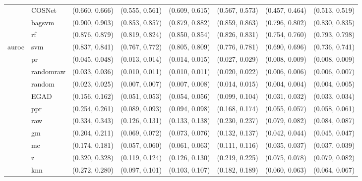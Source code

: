 \begin{table}[H]
{\begin{tabular}{llllllll}
 & COSNet & (0.660, 0.666) & (0.555, 0.561) & (0.609, 0.615) & (0.567, 0.573) & (0.457, 0.464) & (0.513, 0.519)\\

 & bagsvm & (0.900, 0.903) & (0.853, 0.857) & (0.879, 0.882) & (0.859, 0.863) & (0.796, 0.802) & (0.830, 0.835)\\

 & rf & (0.876, 0.879) & (0.819, 0.824) & (0.850, 0.854) & (0.826, 0.831) & (0.754, 0.760) & (0.793, 0.798)\\

\multirow{-15}{*}{\raggedright\arraybackslash auroc} & svm & (0.837, 0.841) & (0.767, 0.772) & (0.805, 0.809) & (0.776, 0.781) & (0.690, 0.696) & (0.736, 0.741)\\
\cmidrule{1-8}
 & pr & (0.045, 0.048) & (0.013, 0.014) & (0.014, 0.015) & (0.027, 0.029) & (0.008, 0.009) & (0.008, 0.009)\\

 & randomraw & (0.033, 0.036) & (0.010, 0.011) & (0.010, 0.011) & (0.020, 0.022) & (0.006, 0.006) & (0.006, 0.007)\\

 & random & (0.023, 0.025) & (0.007, 0.007) & (0.007, 0.008) & (0.014, 0.015) & (0.004, 0.004) & (0.004, 0.005)\\

 & EGAD & (0.156, 0.162) & (0.051, 0.053) & (0.054, 0.056) & (0.099, 0.104) & (0.031, 0.032) & (0.033, 0.034)\\

 & ppr & (0.254, 0.261) & (0.089, 0.093) & (0.094, 0.098) & (0.168, 0.174) & (0.055, 0.057) & (0.058, 0.061)\\

 & raw & (0.334, 0.343) & (0.126, 0.131) & (0.133, 0.138) & (0.230, 0.237) & (0.079, 0.082) & (0.084, 0.087)\\

 & gm & (0.204, 0.211) & (0.069, 0.072) & (0.073, 0.076) & (0.132, 0.137) & (0.042, 0.044) & (0.045, 0.047)\\

 & mc & (0.174, 0.181) & (0.057, 0.060) & (0.061, 0.063) & (0.111, 0.116) & (0.035, 0.037) & (0.037, 0.039)\\

 & z & (0.320, 0.328) & (0.119, 0.124) & (0.126, 0.130) & (0.219, 0.225) & (0.075, 0.078) & (0.079, 0.082)\\

 & knn & (0.272, 0.280) & (0.097, 0.101) & (0.103, 0.107) & (0.182, 0.189) & (0.060, 0.063) & (0.064, 0.067)\\


\end{tabular}}
\end{table}
